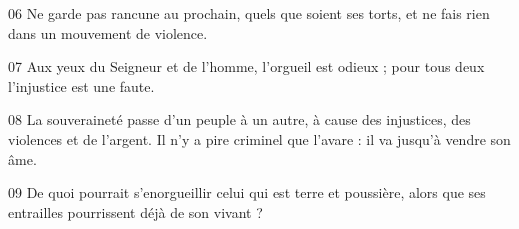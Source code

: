 
06 Ne garde pas rancune au prochain, quels que soient ses torts, et ne fais rien dans un mouvement de violence.

07 Aux yeux du Seigneur et de l’homme, l’orgueil est odieux ; pour tous deux l’injustice est une faute.

08 La souveraineté passe d’un peuple à un autre, à cause des injustices, des violences et de l’argent. Il n’y a pire criminel que l’avare : il va jusqu’à vendre son âme.

09 De quoi pourrait s’enorgueillir celui qui est terre et poussière, alors que ses entrailles pourrissent déjà de son vivant ?
